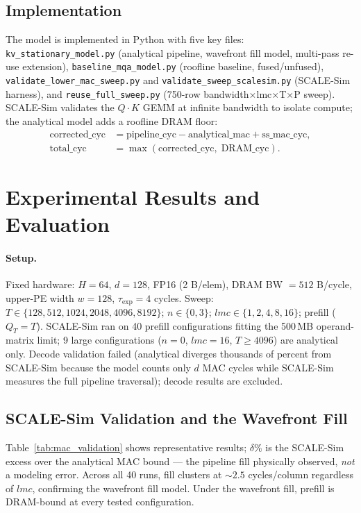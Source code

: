 \documentclass[11pt]{article}
\begin{document}
\subsection{Implementation}

The model is implemented in Python with five key files:
\texttt{kv\_stationary\_model.py} (analytical pipeline, wavefront fill model, multi-pass re-use extension),
\texttt{baseline\_mqa\_model.py} (roofline baseline, fused/unfused),
\texttt{validate\_lower\_mac\_sweep.py} and \texttt{validate\_sweep\_scalesim.py}
(SCALE-Sim harness),
and \texttt{reuse\_full\_sweep.py} (750-row bandwidth$\times$lmc$\times$T$\times$P
sweep).
SCALE-Sim validates the $Q{\cdot}K$ GEMM at infinite bandwidth to isolate compute;
the analytical model adds a roofline DRAM floor:
\begin{align*}
\text{corrected\_cyc} &= \text{pipeline\_cyc} - \text{analytical\_mac} + \text{ss\_mac\_cyc},\\
\text{total\_cyc} &= \max(\text{corrected\_cyc},\;\text{DRAM\_cyc}).
\end{align*}

\section{Experimental Results and Evaluation}

\paragraph{Setup.}
Fixed hardware: $H{=}64$, $d{=}128$, FP16 (2 B/elem), DRAM BW $= 512$ B/cycle,
upper-PE width $w{=}128$, $\tau_{\exp}{=}4$ cycles.
Sweep: $T \in \{128,512,1024,2048,4096,8192\}$;
$n \in \{0,3\}$; $lmc \in \{1,2,4,8,16\}$; prefill ($Q_T{=}T$).
SCALE-Sim ran on 40 prefill configurations fitting the 500\,MB operand-matrix
limit; 9 large configurations ($n{=}0$, $lmc{=}16$, $T{\ge}4096$) are
analytical only.
Decode validation failed (analytical diverges thousands of percent from
SCALE-Sim because the model counts only $d$ MAC cycles while SCALE-Sim measures
the full pipeline traversal); decode results are excluded.

\subsection{SCALE-Sim Validation and the Wavefront Fill}
\label{sec:wavefront}

Table~\ref{tab:mac_validation} shows representative results; $\delta\%$ is the
SCALE-Sim excess over the analytical MAC bound --- the pipeline fill physically
observed, \emph{not} a modeling error.
Across all 40 runs, fill clusters at $\sim\!2.5$ cycles/column regardless of
$lmc$, confirming the wavefront fill model.
Under the wavefront fill, prefill is DRAM-bound at every tested configuration.
\end{document}

